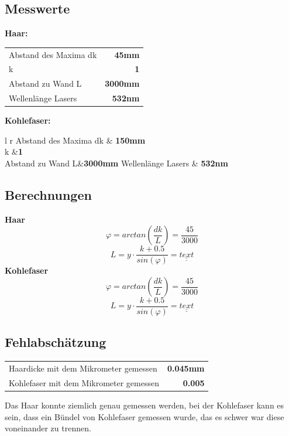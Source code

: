 \documentclass{article}
\begin{document}
\subsection{Messwerte}

\textbf{Haar:}

\begin{tabular}{l r}
	Abstand des Maxima dk & \textbf{45mm}\\
	k	&\textbf{1}\\
	Abstand zu Wand L&\textbf{3000mm}\\
	Wellenlänge Lasers \lambda & \textbf{532nm}
\end{tabular}

\textbf{Kohlefaser:}

\begin{tabular}{l r}
	Abstand des Maxima dk & \textbf{150mm}\\
	k	&\textbf{1}\\
	Abstand zu Wand L&\textbf{3000mm}
	Wellenlänge Lasers \lambda & \textbf{532nm}
\end{tabular}

\subsection{Berechnungen}
\textbf{Haar}
\begin{equation}
\varphi = arctan(\frac{dk}{L}) = \frac{45}{3000}
\end{equation}
\begin{equation}
L = y \cdot \frac{k+0.5}{sin(\varphi)}= \underline{\underline{text}} 
\end{equation}
\textbf{Kohlefaser}
\begin{equation}
\varphi = arctan(\frac{dk}{L}) = \frac{45}{3000}
\end{equation}
\begin{equation}
L = y \cdot \frac{k+0.5}{sin(\varphi)}= \underline{\underline{text}} 
\end{equation}
\subsection{Fehlabschätzung}
\begin{tabular}{l r}
	Haardicke mit dem Mikrometer gemessen & \textbf{0.045mm}\\
	Kohlefaser mit dem Mikrometer gemessen	&\textbf{0.005}\\
\end{tabular}
Das Haar konnte ziemlich genau gemessen werden, bei der Kohlefaser kann es sein, dass ein Bündel
von Kohlefaser gemessen wurde, das es schwer war diese voneinander zu trennen.
\end{document}
